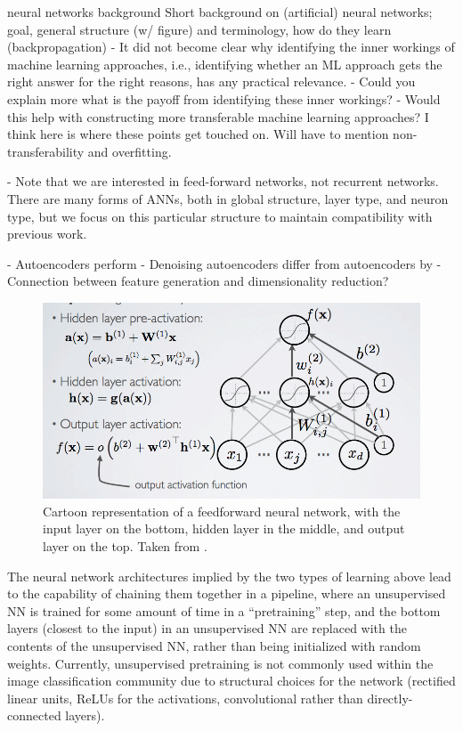 \documentclass[12pt]{article}
\begin{document}
\begin{anfxnote}{neural networks background}
Short background on (artificial) neural networks; goal, general structure (w/ figure) and terminology, how do they learn (backpropagation)
- It did not become clear why identifying the inner workings of machine learning approaches, i.e., identifying whether an ML approach gets the right answer for the right reasons, has any practical relevance.
- Could you explain more what is the payoff from identifying these inner workings?
- Would this help with constructing more transferable machine learning approaches?
I think here is where these points get touched on. Will have to mention non-transferability and overfitting.

- Note that we are interested in feed-forward networks, not recurrent networks. There are many forms of ANNs, both in global structure, layer type, and neuron type, but we focus on this particular structure to maintain compatibility with previous work.

- Autoencoders perform
- Denoising autoencoders differ from autoencoders by
- Connection between feature generation and dimensionality reduction?
\end{anfxnote}

\begin{figure}[htbp]
\centering
\includegraphics[width=.9\linewidth]{single_hidden_layer_nn.png}
\caption{Cartoon representation of a feedforward neural network, with the input layer on the bottom, hidden layer in the middle, and output layer on the top. Taken from \parencite{blog:dnn2}. }
\end{figure}

The neural network architectures implied by the two types of learning above lead to the capability of chaining them together in a pipeline, where an unsupervised NN is trained for some amount of time in a ``pretraining'' step, and the bottom layers (closest to the input) in an unsupervised NN are replaced with the contents of the unsupervised NN, rather than being initialized with random weights. Currently, unsupervised pretraining is not commonly used within the image classification community due to structural choices for the network (rectified linear units, ReLUs for the activations, convolutional rather than directly-connected layers).
\end{document}
